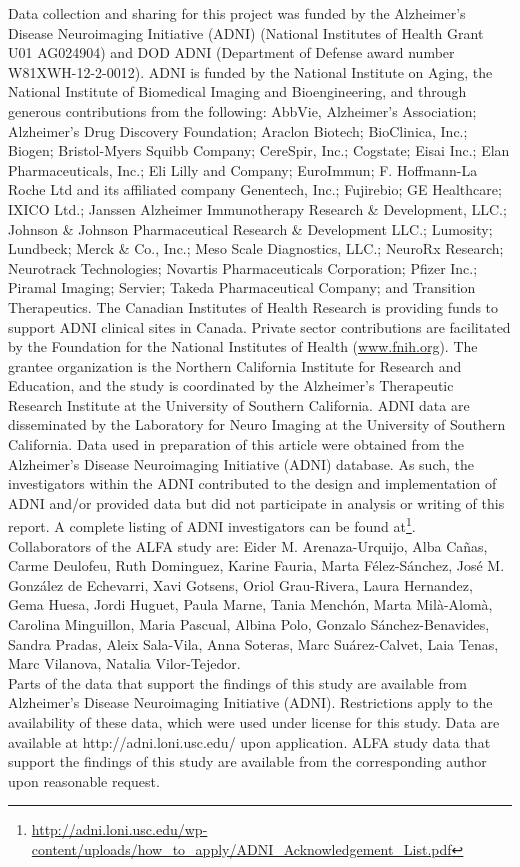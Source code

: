 Data collection and sharing for this project was funded by the Alzheimer's Disease Neuroimaging Initiative (ADNI) (National Institutes of Health Grant U01 AG024904) and DOD ADNI (Department of Defense award number W81XWH-12-2-0012). ADNI is funded by the National Institute on Aging, the National Institute of Biomedical Imaging and Bioengineering, and through generous contributions from the following: AbbVie, Alzheimer’s Association; Alzheimer’s Drug Discovery Foundation; Araclon Biotech; BioClinica, Inc.; Biogen; Bristol-Myers Squibb Company; CereSpir, Inc.; Cogstate; Eisai Inc.; Elan Pharmaceuticals, Inc.; Eli Lilly and Company; EuroImmun; F. Hoffmann-La Roche Ltd and its affiliated company Genentech, Inc.; Fujirebio; GE Healthcare; IXICO Ltd.; Janssen Alzheimer Immunotherapy Research {\&} Development, LLC.; Johnson {\&} Johnson Pharmaceutical Research {\&} Development LLC.; Lumosity; Lundbeck; Merck {\&} Co., Inc.; Meso Scale Diagnostics, LLC.; NeuroRx Research; Neurotrack Technologies; Novartis Pharmaceuticals Corporation; Pfizer Inc.; Piramal Imaging; Servier; Takeda Pharmaceutical Company; and Transition Therapeutics. The Canadian Institutes of Health Research is providing funds to support ADNI clinical sites in Canada. Private sector contributions are facilitated by the Foundation for the National Institutes of Health (\url{www.fnih.org}). The grantee organization is the Northern California Institute for Research and Education, and the study is coordinated by the Alzheimer’s Therapeutic Research Institute at the University of Southern California. ADNI data are disseminated by the Laboratory for Neuro Imaging at the University of Southern California. Data used in preparation of this article were obtained from the Alzheimer’s Disease Neuroimaging Initiative (ADNI) database. As such, the investigators within the ADNI contributed to the design and implementation of ADNI and/or provided data but did not participate in analysis or writing of this report. A complete listing of ADNI investigators can be found at\footnote{\url{http://adni.loni.usc.edu/wp-content/uploads/how_to_apply/ADNI_Acknowledgement_List.pdf}}. \\

Collaborators of the ALFA study are: Eider M. Arenaza-Urquijo, Alba Cañas, Carme Deulofeu, Ruth Dominguez, Karine Fauria, Marta Félez-Sánchez, José M. González de Echevarri, Xavi Gotsens, Oriol Grau-Rivera, Laura Hernandez, Gema Huesa, Jordi Huguet, Paula Marne, Tania Menchón, Marta Milà-Alomà, Carolina Minguillon, Maria Pascual, Albina Polo, Gonzalo Sánchez-Benavides, Sandra Pradas, Aleix Sala-Vila, Anna Soteras, Marc Suárez-Calvet, Laia Tenas, Marc Vilanova, Natalia Vilor-Tejedor. \\

Parts of the data that support the findings of this study are available from Alzheimer’s Disease Neuroimaging Initiative (ADNI). Restrictions apply to the availability of these data, which were used under license for this study. Data are available at http://adni.loni.usc.edu/ upon application. ALFA study data that support the findings of this study are available from the corresponding author upon reasonable request. 


